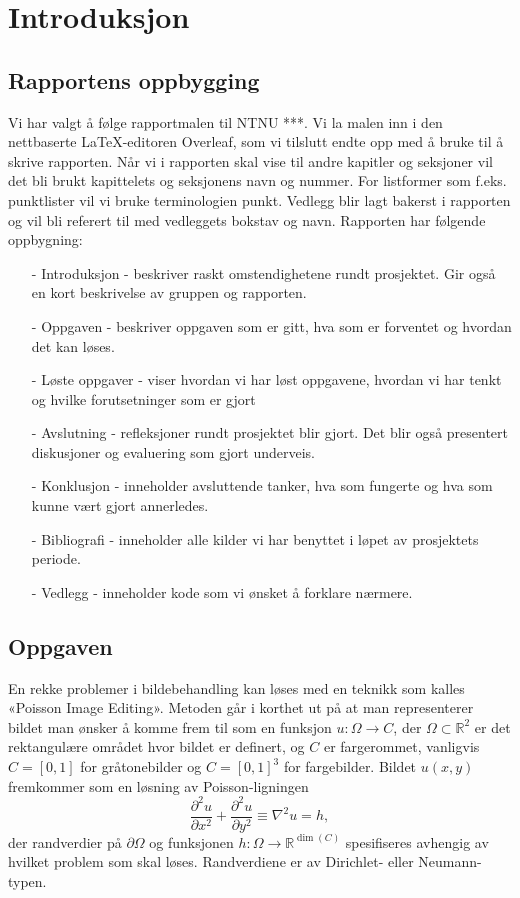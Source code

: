 \section{Introduksjon}


\subsection{Rapportens oppbygging}
Vi har valgt å følge rapportmalen til NTNU ***. Vi la malen inn i den nettbaserte LaTeX-editoren Overleaf, som vi tilslutt endte opp med å bruke til å skrive rapporten. Når vi i rapporten skal vise til andre kapitler og seksjoner vil det bli brukt kapittelets og seksjonens navn og nummer. For listformer som f.eks. punktlister vil vi bruke terminologien punkt. Vedlegg blir lagt bakerst i rapporten og vil bli referert til med vedleggets bokstav og navn. Rapporten har følgende oppbygning:
\begin{itemize}
  \item[-] Introduksjon - beskriver raskt omstendighetene rundt prosjektet. Gir også en kort beskrivelse av gruppen og rapporten.
  \item[-] Oppgaven - beskriver oppgaven som er gitt, hva som er forventet og hvordan det kan løses.
  \item[-] Løste oppgaver - viser hvordan vi har løst oppgavene, hvordan vi har tenkt og hvilke forutsetninger som er gjort
  \item[-] Avslutning - refleksjoner rundt prosjektet blir gjort. Det blir også presentert diskusjoner og evaluering som gjort underveis.
  \item[-] Konklusjon - inneholder avsluttende tanker, hva som fungerte og hva som kunne vært gjort annerledes.
  \item[-] Bibliografi - inneholder alle kilder vi har benyttet i løpet av prosjektets periode.
  \item[-] Vedlegg - inneholder kode som vi ønsket å forklare nærmere.
\end{itemize}

\subsection{Oppgaven}
En rekke problemer i bildebehandling kan løses med en teknikk som kalles «Poisson Image Editing». Metoden går i korthet ut på at man representerer bildet man ønsker å komme frem til som en funksjon $u : \Omega \to C$, der $\Omega \subset \mathbb{R}^2$ er det rektangulære området hvor bildet er definert, og $C$ er fargerommet, vanligvis $C = [0, 1]$ for gråtonebilder og $C = [0, 1]^3$ for fargebilder. Bildet $u(x, y)$ fremkommer som en løsning av Poisson-ligningen
\begin{equation}
  \frac{\partial^2 u}{\partial x^2} + \frac{\partial^2 u}{\partial y^2} \equiv \nabla^2 u = h,
  \label{eq:poisson}
\end{equation}
der randverdier på $\partial\Omega$ og funksjonen $h : \Omega \to \mathbb{R}^{\dim(C)}$ spesifiseres avhengig av hvilket problem som skal løses. Randverdiene er av Dirichlet- eller Neumann-typen.

